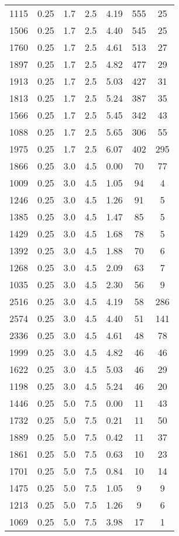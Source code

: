\documentclass{aastex62}
\begin{document}
\begin{table}
\begin{tabular}{ccccccc}
1115 & 0.25 & 1.7 & 2.5 & 4.19 & 555 & 25 \\ 
1506 & 0.25 & 1.7 & 2.5 & 4.40 & 545 & 25 \\ 
1760 & 0.25 & 1.7 & 2.5 & 4.61 & 513 & 27 \\ 
1897 & 0.25 & 1.7 & 2.5 & 4.82 & 477 & 29 \\ 
1913 & 0.25 & 1.7 & 2.5 & 5.03 & 427 & 31 \\ 
1813 & 0.25 & 1.7 & 2.5 & 5.24 & 387 & 35 \\ 
1566 & 0.25 & 1.7 & 2.5 & 5.45 & 342 & 43 \\ 
1088 & 0.25 & 1.7 & 2.5 & 5.65 & 306 & 55 \\ 
1975 & 0.25 & 1.7 & 2.5 & 6.07 & 402 & 295 \\ 
1866 & 0.25 & 3.0 & 4.5 & 0.00 & 70 & 77 \\ 
1009 & 0.25 & 3.0 & 4.5 & 1.05 & 94 & 4 \\ 
1246 & 0.25 & 3.0 & 4.5 & 1.26 & 91 & 5 \\ 
1385 & 0.25 & 3.0 & 4.5 & 1.47 & 85 & 5 \\ 
1429 & 0.25 & 3.0 & 4.5 & 1.68 & 78 & 5 \\ 
1392 & 0.25 & 3.0 & 4.5 & 1.88 & 70 & 6 \\ 
1268 & 0.25 & 3.0 & 4.5 & 2.09 & 63 & 7 \\ 
1035 & 0.25 & 3.0 & 4.5 & 2.30 & 56 & 9 \\ 
2516 & 0.25 & 3.0 & 4.5 & 4.19 & 58 & 286 \\ 
2574 & 0.25 & 3.0 & 4.5 & 4.40 & 51 & 141 \\ 
2336 & 0.25 & 3.0 & 4.5 & 4.61 & 48 & 78 \\ 
1999 & 0.25 & 3.0 & 4.5 & 4.82 & 46 & 46 \\ 
1622 & 0.25 & 3.0 & 4.5 & 5.03 & 46 & 29 \\ 
1198 & 0.25 & 3.0 & 4.5 & 5.24 & 46 & 20 \\ 
1446 & 0.25 & 5.0 & 7.5 & 0.00 & 11 & 43 \\ 
1732 & 0.25 & 5.0 & 7.5 & 0.21 & 11 & 50 \\ 
1889 & 0.25 & 5.0 & 7.5 & 0.42 & 11 & 37 \\ 
1861 & 0.25 & 5.0 & 7.5 & 0.63 & 10 & 23 \\ 
1701 & 0.25 & 5.0 & 7.5 & 0.84 & 10 & 14 \\ 
1475 & 0.25 & 5.0 & 7.5 & 1.05 & 9 & 9 \\ 
1213 & 0.25 & 5.0 & 7.5 & 1.26 & 9 & 6 \\ 
1069 & 0.25 & 5.0 & 7.5 & 3.98 & 17 & 1 \\ 

\end{tabular}
\end{table}
\end{document}
